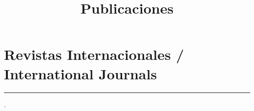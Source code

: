 \documentclass{article}
\title{Publicaciones}
\begin{document}
\maketitle

\tableofcontents

\renewcommand{\refname}{}
\section{Revistas Internacionales / International Journals}


\hrule
\currenttime.
\end{document}
